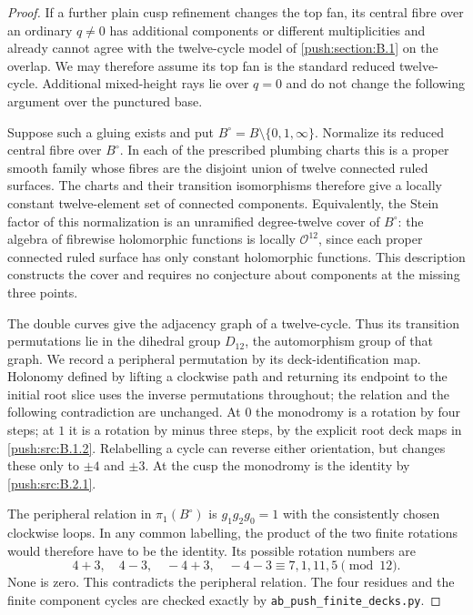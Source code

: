\begin{proof}
If a further plain cusp refinement changes the top fan,
its central fibre over an ordinary $q\ne0$ has additional
components or different multiplicities and already cannot
agree with the twelve-cycle model of \ref{push:section:B.1} on the overlap.
We may therefore assume its top fan is the standard reduced
twelve-cycle. Additional mixed-height rays lie over $q=0$
and do not change the following argument over the punctured
base.

Suppose such a gluing exists and put
$B^\circ=B\setminus\{0,1,\infty\}$. Normalize
its reduced central fibre over $B^\circ$. In
each of the prescribed plumbing charts this is
a proper smooth family whose fibres are the
disjoint union of twelve connected ruled
surfaces. The charts and their transition
isomorphisms therefore give a locally constant
twelve-element set of connected components.
Equivalently, the Stein factor of this
normalization is an unramified degree-twelve
cover of $B^\circ$: the algebra of fibrewise
holomorphic functions is locally $\mathcal O^{12}$,
since each proper connected ruled surface has
only constant holomorphic functions. This
description constructs the cover and requires
no conjecture about components at the missing
three points.

The double curves give the adjacency graph of
a twelve-cycle. Thus its transition
permutations lie in the dihedral group
$D_{12}$, the automorphism group of that graph.
We record a peripheral permutation by its
deck-identification map. Holonomy defined by
lifting a clockwise path and returning its
endpoint to the initial root slice uses the
inverse permutations throughout; the relation
and the following contradiction are unchanged.
At $0$ the monodromy is a rotation by four
steps; at $1$ it is a rotation by minus three
steps, by the explicit root deck maps in
\ref{push:src:B.1.2}. Relabelling a cycle can reverse either
orientation, but changes these only to
$\pm4$ and $\pm3$. At the cusp the
monodromy is the identity by \ref{push:src:B.2.1}.

The peripheral relation in
$\pi_1(B^\circ)$ is $g_1g_2g_0=1$ with
the consistently chosen clockwise loops.
In any common labelling, the product of the
two finite rotations would therefore have
to be the identity. Its possible rotation
numbers are
\[
 4+3,\quad4-3,\quad-4+3,\quad-4-3
 \equiv7,1,11,5\pmod {12}.
\]
None is zero. This contradicts the peripheral
relation. The four residues and the finite
component cycles are checked exactly by
\texttt{ab\_push\_finite\_decks.py}.
\end{proof}

